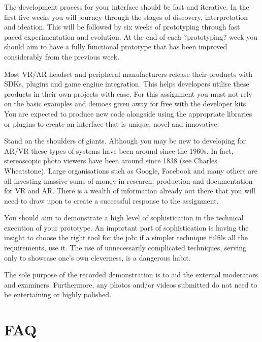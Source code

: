 \documentclass{../../fal_assignment}
\begin{document}
The development process for your interface should be fast and iterative. In the first five weeks you will journey through the stages of discovery, interpretation and ideation. This will be followed by six weeks of prototyping through fast paced experimentation and evolution. At the end of each ?prototyping? week you should aim to have a fully functional prototype that has been improved considerably from the previous week. 

Most VR/AR headset and peripheral manufacturers release their products with SDKs, plugins and game engine integration. This helps developers utilise these products in their own projects with ease. For this assignment you must not rely on the basic examples and demoes given away for free with the developer kits.  You are expected to produce new code alongside using the appropriate libraries or plugins to create an interface that is unique, novel and innovative. 

Stand on the shoulders of giants. Although you may be new to developing for AR/VR these types of systems have been around since the 1960s. In fact, stereoscopic photo viewers have been around since 1838 (see Charles Wheatstone). Large organisations such as Google, Facebook and many others are all investing massive sums of money in research, production and documentation for VR and AR. There is a wealth of information already out there that you will need to draw upon to create a successful response to the assignment. 

You should aim to demonstrate a high level of sophistication in the technical execution of your prototype. An important part of sophistication is having the insight to choose the right tool for the job: if a simpler technique fulfils all the requirements, use it. The use of unnecessarily complicated techniques, serving only to showcase one's own cleverness, is a dangerous habit. 

The sole purpose of the recorded demonstration is to aid the external moderators and examiners. Furthermore, any photos and/or videos submitted do not need to be entertaining or highly polished.

\section*{FAQ}
\end{document}
